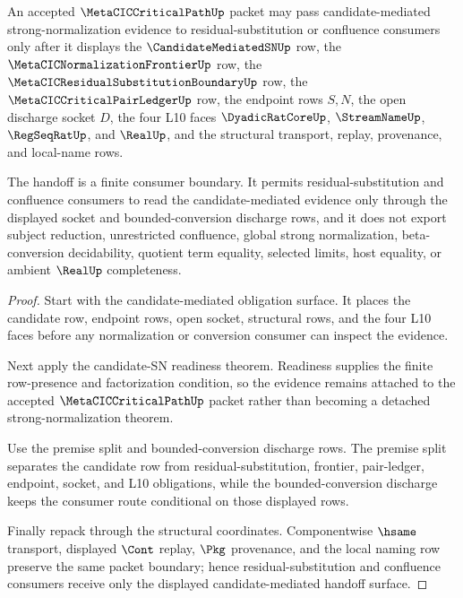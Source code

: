\begin{theorem}
\label{thm:metacic-critical-path-residual-candidate-sn-handoff}
An accepted $\MetaCICCriticalPathUp$ packet may pass candidate-mediated strong-normalization evidence to residual-substitution or confluence consumers only after it displays the $\CandidateMediatedSNUp$ row, the $\MetaCICNormalizationFrontierUp$ row, the $\MetaCICResidualSubstitutionBoundaryUp$ row, the $\MetaCICCriticalPairLedgerUp$ row, the endpoint rows $S,N$, the open discharge socket $D$, the four L10 faces $\DyadicRatCoreUp$, $\StreamNameUp$, $\RegSeqRatUp$, and $\RealUp$, and the structural transport, replay, provenance, and local-name rows.

The handoff is a finite consumer boundary. It permits residual-substitution and confluence consumers to read the candidate-mediated evidence only through the displayed socket and bounded-conversion discharge rows, and it does not export subject reduction, unrestricted confluence, global strong normalization, beta-conversion decidability, quotient term equality, selected limits, host equality, or ambient $\RealUp$ completeness.
\end{theorem}
\begin{proof}
Start with the candidate-mediated obligation surface. It places the candidate row, endpoint rows, open socket, structural rows, and the four L10 faces before any normalization or conversion consumer can inspect the evidence.

Next apply the candidate-SN readiness theorem. Readiness supplies the finite row-presence and factorization condition, so the evidence remains attached to the accepted $\MetaCICCriticalPathUp$ packet rather than becoming a detached strong-normalization theorem.

Use the premise split and bounded-conversion discharge rows. The premise split separates the candidate row from residual-substitution, frontier, pair-ledger, endpoint, socket, and L10 obligations, while the bounded-conversion discharge keeps the consumer route conditional on those displayed rows.

Finally repack through the structural coordinates. Componentwise $\hsame$ transport, displayed $\Cont$ replay, $\Pkg$ provenance, and the local naming row preserve the same packet boundary; hence residual-substitution and confluence consumers receive only the displayed candidate-mediated handoff surface.
\end{proof}

